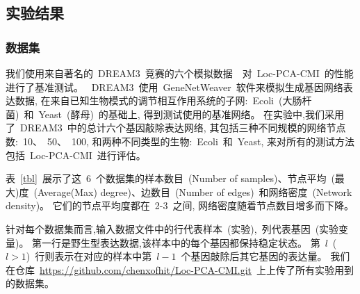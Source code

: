 \subsection{实验结果}

\subsubsection{数据集}

我们使用来自著名的~DREAM3~竞赛的六个模拟数据~\cite{schaffter2011genenetweaver}~对~Loc-PCA-CMI~的性能进行了基准测试。
~DREAM3~使用~GeneNetWeaver~软件来模拟生成基因网络表达数据,
在来自已知生物模式的调节相互作用系统的子网:~Ecoli~(大肠杆菌)~和~Yeast~(酵母)~的基础上,
得到测试使用的基准网络。 
在实验中,我们采用了~DREAM3~中的总计六个基因敲除表达网络,
其包括三种不同规模的网络节点数:~10、~50、~100, 和两种不同类型的生物:~Ecoli~和~Yeast, 来对所有的测试方法包括~Loc-PCA-CMI~进行评估。

表~\ref{tbl}~展示了这~6~个数据集的样本数目~(Number of samples)、节点平均~(最大)度~(Average(Max) degree)、边数目~(Number of edges)~和网络密度~(Network density)。
它们的节点平均度都在~2-3~之间, 
网络密度随着节点数目增多而下降。
\begin{table} [!htbp]
\caption{实验所使用的数据集描述} 
\label{tbl} 
\begin{center}
\end{center}
\end{table} 

针对每个数据集而言,输入数据文件中的行代表样本~(实验),~列代表基因~(实验变量)。
第一行是野生型表达数据,该样本中的每个基因都保持稳定状态。
第~$l$~($l>1$)~行则表示在对应的样本中第~$l-1$~个基因敲除后其它基因的表达量。
我们在仓库~\url{https://github.com/chenxofhit/Loc-PCA-CMI.git}~上上传了所有实验用到的数据集。

